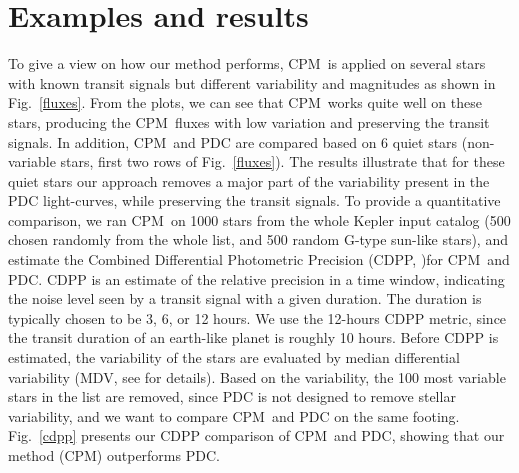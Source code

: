 \documentclass[12pt, preprint]{aastex}
\newcommand{\name}{CPM}
\begin{document}
\clearpage

\section{Examples and results}

To give a view on how our method performs, \name\ is applied on several stars with 
known transit signals but different variability and magnitudes as shown in Fig.~\ref{fluxes}. 
From the plots, we can see that \name\ works quite well on these stars, producing the \name\ fluxes 
with low variation and preserving the transit signals.
In addition, \name\ and PDC are compared based on 6 quiet stars 
(non-variable stars, first two rows of Fig.~\ref{fluxes}). 
The results illustrate that for these quiet stars our approach removes 
a major part of the variability present in the PDC light-curves, while preserving the transit signals. 
To provide a quantitative comparison, we ran \name\ on 1000 stars from the whole Kepler input catalog 
(500 chosen randomly from the whole list, and 500 random G-type sun-like stars), 
and estimate the Combined Differential Photometric Precision (CDPP,  \cite{cdpp1} )for \name\ and PDC. 
CDPP is an estimate of the relative precision in a time window, 
indicating the noise level seen by a transit signal with a given duration. 
The duration is typically chosen to be 3, 6, or 12 hours. 
We use the 12-hours CDPP metric, since the transit duration of an earth-like planet is roughly 10 hours. 
Before CDPP is estimated, the variability of the stars are evaluated by median differential variability 
  (MDV, see \cite{basri2013} for details). 
Based on the variability, the 100 most variable stars in the list are removed, 
  since PDC is not designed to remove stellar variability, 
  and we want to compare \name\ and PDC on the same footing.
Fig.~\ref{cdpp} presents our CDPP comparison of \name\ and PDC, 
  showing that our method (\name) outperforms PDC. 
\end{document}
